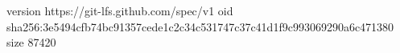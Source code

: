 version https://git-lfs.github.com/spec/v1
oid sha256:3e5494cfb74bc91357cede1c2c34c531747c37c41d1f9c993069290a6c471380
size 87420

